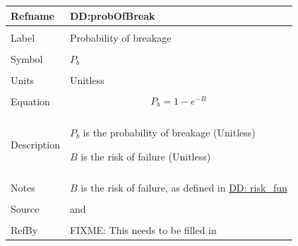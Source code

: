 \documentclass[12pt]{article}
\begin{document}
\noindent \begin{minipage}{\textwidth}
\begin{tabular}{p{} p{}}
\toprule \textbf{Refname} & \textbf{DD:probOfBreak}
\label{DD:probOfBreak}
\\ \midrule \\
Label & Probability of breakage
\\ \midrule \\
Symbol & ${P_{b}}$
\\ \midrule \\
Units & Unitless
\\ \midrule \\
Equation & \begin{dmath}
           {P_{b}}=1-e^{-B}
           \end{dmath}
\\ \midrule \\
Description & \begin{symbDescription}
              \item{${P_{b}}$ is the probability of breakage (Unitless)}
              \item{$B$ is the risk of failure (Unitless)}
              \end{symbDescription}
\\ \midrule \\
Notes & $B$ is the risk of failure, as defined in \hyperref[DD:risk.fun]{DD: risk\_fun}
\\ \midrule \\
Source & \cite{astm2009} and \cite{beasonEtAl1998}
\\ \midrule \\
RefBy & FIXME: This needs to be filled in
\\ \bottomrule \end{tabular}
\end{minipage}\\
~\newline
\end{document}
